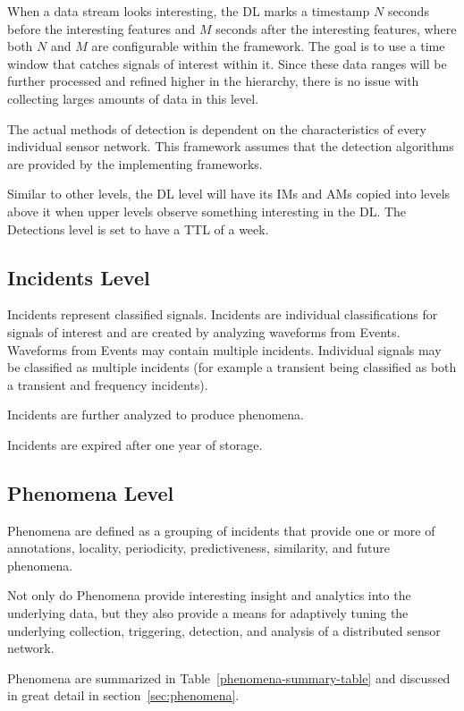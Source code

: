 When a data stream looks interesting, the DL marks a timestamp $N$ seconds before the interesting features and $M$ seconds after the interesting features, where both $N$ and $M$ are configurable within the framework. The goal is to use a time window that catches signals of interest within it. Since these data ranges will be further processed and refined higher in the hierarchy, there is no issue with collecting larges amounts of data in this level.

The actual methods of detection is dependent on the characteristics of every individual sensor network. This framework assumes that the detection algorithms are provided by the implementing frameworks.

Similar to other levels, the DL level will have its IMs and AMs copied into levels above it when upper levels observe something interesting in the DL. The Detections level is set to have a TTL of a week.

\subsection{Incidents Level}\label{subsec:incidents-level}
Incidents represent classified signals. Incidents are individual classifications for signals of interest and are created by analyzing waveforms from Events. Waveforms from Events may contain multiple incidents. Individual signals may be classified as multiple incidents (for example a transient being classified as both a transient and frequency incidents).

Incidents are further analyzed to produce phenomena.

Incidents are expired after one year of storage.


\subsection{Phenomena Level}\label{subsec:phenomena-level}
Phenomena are defined as a grouping of incidents that provide one or more of annotations, locality, periodicity, predictiveness, similarity, and future phenomena.

Not only do Phenomena provide interesting insight and analytics into the underlying data, but they also provide a means for adaptively tuning the underlying collection, triggering, detection, and analysis of a distributed sensor network.

Phenomena are summarized in Table~\ref{phenomena-summary-table} and discussed in great detail in section~\ref{sec:phenomena}.


